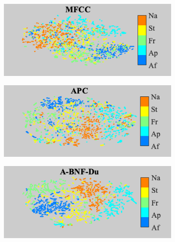 \documentclass[transmag]{IEEEtran}
\begin{document}
\begin{table}[!t]
\label{table:analyses_pairwise_af_moa}
\end{table}
\begin{figure}[!t]
    \begin{subfigure}{0.49\linewidth}
	   \centering
	   \includegraphics[width=1\linewidth]{Rtsne_af_moa_mfcc_disc_bar_adjust_journal.png}
    \end{subfigure}
   \begin{subfigure}{0.49\linewidth}
	   \centering
	   \includegraphics[width=1\linewidth]{Rtsne_af_moa_apc_unlab_600_disc_bar_adjust_journal.png}
    \end{subfigure}
    \newline
   \begin{subfigure}{0.49\linewidth}
	   \centering
	   \includegraphics[width=1\linewidth]{Rtsne_af_moa_bnf_cgn_apc_input_disc_bar_adjust_journal.png}

\end{subfigure}
\end{figure}
\end{document}
